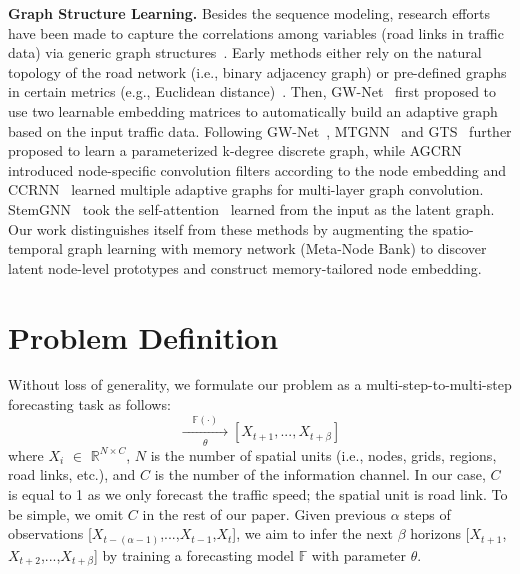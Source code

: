 \documentclass[letterpaper]{article} \usepackage{aaai23}  \usepackage{times}  \usepackage{helvet}  \usepackage{courier}  \usepackage[hyphens]{url}  \usepackage{graphicx} \urlstyle{rm} \def\UrlFont{\rm}  \usepackage{natbib}  \usepackage{caption} \usepackage{multirow}
\begin{document}
\noindent\textbf{Graph Structure Learning.} Besides the sequence modeling, research efforts have been made to capture the correlations among variables (road links in traffic data) via generic graph structures~\cite{kipf2018neural}.
Early methods either rely on the natural topology of the road network (i.e., binary adjacency graph) or pre-defined graphs in certain metrics (e.g., Euclidean distance)~\cite{li2018diffusion,yu2018spatio}. Then, GW-Net~\cite{wu2019graph} first proposed to use two learnable embedding matrices to automatically build an adaptive graph based on the input traffic data. Following GW-Net~\cite{wu2019graph}, MTGNN~\cite{wu2020connecting} and GTS~\cite{shang2021discrete} further proposed to learn a parameterized k-degree discrete graph, while AGCRN~\cite{bai2020adaptive} introduced node-specific convolution filters according to the node embedding and CCRNN~\cite{ye2021coupled} learned multiple adaptive graphs for multi-layer graph convolution. StemGNN~\cite{cao2020spectral} took the self-attention~\cite{vaswani2017attention} learned from the input as the latent graph. Our work distinguishes itself from these methods by augmenting the spatio-temporal graph learning with memory network (Meta-Node Bank) to discover latent node-level prototypes and construct memory-tailored node embedding.





\section{Problem Definition}
Without loss of generality, we formulate our problem as a multi-step-to-multi-step forecasting task as follows: 
\begin{equation}
    [X_{t-(\alpha-1)}, ..., X_{t}] \xrightarrow[\theta]{ \quad \mathbb{F}(\cdot) \quad}  [X_{t+1}, ..., X_{t+\beta}]
\end{equation}
where $X_i$ $\in$ $\mathbb{R}^{N \times C}$, $N$ is the number of spatial units (i.e., nodes, grids, regions, road links, etc.), and $C$ is the number of the information channel. In our case, $C$ is equal to 1 as we only forecast the traffic speed; the spatial unit is road link. To be simple, we omit $C$ in the rest of our paper. Given previous $\alpha$ steps of observations [$X_{t-(\alpha-1)}$,...,$X_{t-1}$,$X_{t}$], 
we aim to infer the next $\beta$ horizons [$X_{t+1}$,$X_{t+2}$,...,$X_{t+\beta}$] by training a forecasting model $\mathbb{F}$ with parameter $\theta$. 
\end{document}
